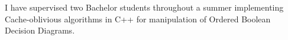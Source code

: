 I have supervised two Bachelor students throughout a summer implementing
Cache-oblivious algorithms in C++ for manipulation of Ordered Boolean Decision
Diagrams.